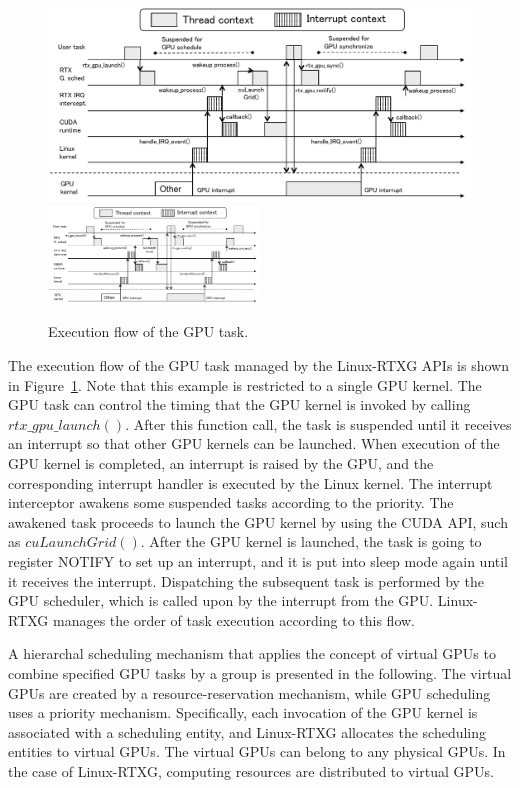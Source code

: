 \begin{figure}[!t]
\begin{center}
 \ifthesis
 \includegraphics[width=\textwidth]{img/gsched_controlflow.pdf}
 \else
 \includegraphics[width=0.5\textwidth]{img/gsched_controlflow.pdf}
 \fi
\caption{Execution flow of the GPU task.}
\label{fig:controlflow}
\end{center}
\end{figure}

The execution flow of the GPU task managed by the Linux-RTXG APIs is shown in Figure~\ref{fig:controlflow}.
Note that this example is restricted to a single GPU kernel.
The GPU task can control the timing that the GPU kernel is invoked by calling $rtx\_gpu\_launch()$.
After this function call, the task is suspended until it receives an interrupt so that other GPU kernels can be launched.
When execution of the GPU kernel is completed, an interrupt is raised by the GPU, and the corresponding interrupt handler is executed by the Linux kernel.
The interrupt interceptor awakens some suspended tasks according to the priority.
The awakened task proceeds to launch the GPU kernel by using the CUDA API, such as $cuLaunchGrid()$.
After the GPU kernel is launched, the task is going to register NOTIFY to set up an interrupt, and it is put into sleep mode again until it receives the interrupt.
Dispatching the subsequent task is performed by the GPU scheduler, which is called upon by the interrupt from the GPU.
Linux-RTXG manages the order of task execution according to this flow.


A hierarchal scheduling mechanism that applies the concept of virtual GPUs to combine specified GPU tasks by a group is presented in the following.
The virtual GPUs are created by a resource-reservation mechanism, while GPU scheduling uses a priority mechanism.
Specifically, each invocation of the GPU kernel is associated with a scheduling entity, and Linux-RTXG allocates the scheduling entities to virtual GPUs.
The virtual GPUs can belong to any physical GPUs.
In the case of Linux-RTXG, computing resources are distributed to virtual GPUs.

